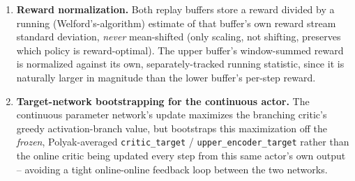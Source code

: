 \begin{enumerate}
  \item \textbf{Reward normalization.} Both replay buffers store a reward
    divided by a running (Welford's-algorithm) estimate of that buffer's
    own reward stream standard deviation, \emph{never} mean-shifted (only
    scaling, not shifting, preserves which policy is reward-optimal). The
    upper buffer's window-summed reward is normalized against its own,
    separately-tracked running statistic, since it is naturally larger in
    magnitude than the lower buffer's per-step reward.
  \item \textbf{Target-network bootstrapping for the continuous actor.}
    The continuous parameter network's update maximizes the branching
    critic's greedy activation-branch value, but bootstraps this
    maximization off the \emph{frozen}, Polyak-averaged
    \texttt{critic\_target} / \texttt{upper\_encoder\_target} rather than the
    online critic being updated every step from this same actor's own
    output -- avoiding a tight online-online feedback loop between the two
    networks.
\end{enumerate}

